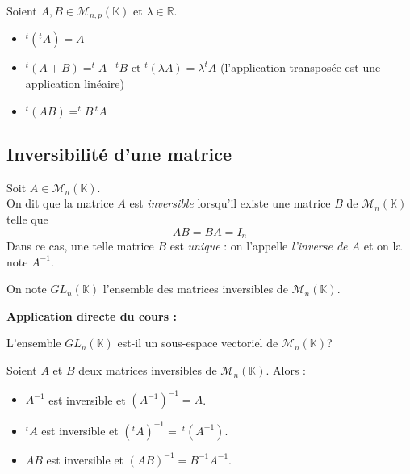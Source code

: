 \documentclass[french,11pt,twoside]{VcCours}
\newenvironment{ApplicationDirecte}{\textbf{Application directe du cours :}

}{}
\begin{document}

\begin{Proposition}{}
Soient $A,B \in \mathcal{M}_{n,p}(\mathbb{K})$ et $\lambda \in \mathbb{R}$.
\begin{itemize}
\item 
$^t(^tA)= A$ 
\item 
$^t(A+B)=^tA + ^tB $ et $^t( \lambda A) = \lambda ^tA$ (l'application transposée est une application linéaire)
\item $^t(AB) =^tB \, ^tA$
\end{itemize}
\end{Proposition}


\subsection{Inversibilité d'une matrice}
\begin{TheoremeDefinition}{}
Soit $A \in \mathcal{M}_n(\mathbb{K})$.\\
On dit que la matrice $A$ est \emph{inversible} lorsqu'il existe une matrice $B$ de $\mathcal{M}_n(\mathbb{K})$ telle que
$$AB=BA=I_n$$
Dans ce cas, une telle matrice $B$ est \emph{unique} : on l'appelle \emph{l'inverse de $A$} et on la note $A^{-1}$.

On note $GL_{n}(\mathbb{K})$ l'ensemble des matrices inversibles de $\mathcal{M}_n(\mathbb{K})$.
\end{TheoremeDefinition}
%

\begin{ApplicationDirecte} L'ensemble $GL_{n}(\mathbb{K})$ est-il un sous-espace vectoriel de $\mathcal{M}_n(\mathbb{K})$?
\end{ApplicationDirecte}


\begin{Proposition}{}
Soient $A$ et $B$ deux matrices inversibles de $\mathcal{M}_n(\mathbb{K})$. Alors : 
\begin{itemize}
\item $A^{-1}$ est inversible et $(A^{-1})^{-1}=A$.
\item $^tA$ est inversible et $(^tA)^{-1} = \ ^t(A^{-1})$.
\item $AB$ est inversible et $(AB)^{-1}=B^{-1}A^{-1}$.
\end{itemize}
\end{Proposition}
\end{document}
